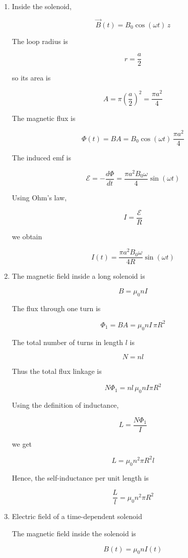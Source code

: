 \documentclass[12pt]{article}
\begin{document}
\begin{enumerate}
\begin{itemize}
\[
\boxed{\text{counterclockwise.}}
\]

\end{itemize}

\item Inside the solenoid,

\[
\vec B(t)=B_0\cos(\omega t)\,\hat z
\]

The loop radius is

\[
r=\frac{a}{2}
\]

so its area is

\[
A=\pi\left(\frac a2\right)^2
=
\frac{\pi a^2}{4}
\]

The magnetic flux is

\[
\Phi(t)=BA
=
B_0\cos(\omega t)\,
\frac{\pi a^2}{4}
\]

The induced emf is

\[
\mathcal E
=
-\frac{d\Phi}{dt}
=
\frac{\pi a^2 B_0\omega}{4}
\sin(\omega t)
\]

Using Ohm’s law,

\[
I=\frac{\mathcal E}{R}
\]

we obtain

\[
\boxed{
I(t)
=
\frac{\pi a^2 B_0\omega}{4R}
\sin(\omega t)
}
\]

\item The magnetic field inside a long solenoid is

\[
B=\mu_0 n I
\]

The flux through one turn is

\[
\Phi_1
=
BA
=
\mu_0 n I \,\pi R^2
\]

The total number of turns in length \(l\) is

\[
N=nl
\]

Thus the total flux linkage is

\[
N\Phi_1
=
nl\,
\mu_0 n I \pi R^2
\]

Using the definition of inductance,

\[
L=\frac{N\Phi_1}{I}
\]

we get

\[
L
=
\mu_0 n^2 \pi R^2 l
\]

Hence, the self-inductance per unit length is

\[
\boxed{
\frac{L}{l}
=
\mu_0 n^2 \pi R^2
}
\]

\item Electric field of a time-dependent solenoid

The magnetic field inside the solenoid is

\[
B(t)=\mu_0 n I(t)
\]


\end{enumerate}
\end{document}
